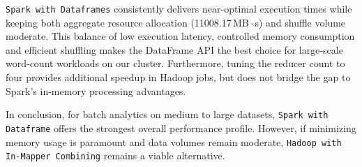 \texttt{Spark with Dataframes} consistently delivers near‑optimal execution times while keeping both aggregate resource allocation (11008.17\,MB\,$\cdot$\,s) and shuffle volume moderate. This balance of low execution latency, controlled memory consumption and efficient shuffling makes the DataFrame API the best choice for large‑scale word‑count workloads on our cluster. Furthermore, tuning the reducer count to four provides additional speedup in Hadoop jobs, but does not bridge the gap to Spark’s in‑memory processing advantages.

In conclusion, for batch analytics on medium to large datasets, \texttt{Spark with Dataframe} offers the strongest overall performance profile. However, if minimizing memory usage is paramount and data volumes remain moderate, \texttt{Hadoop with In-Mapper Combining} remains a viable alternative.
